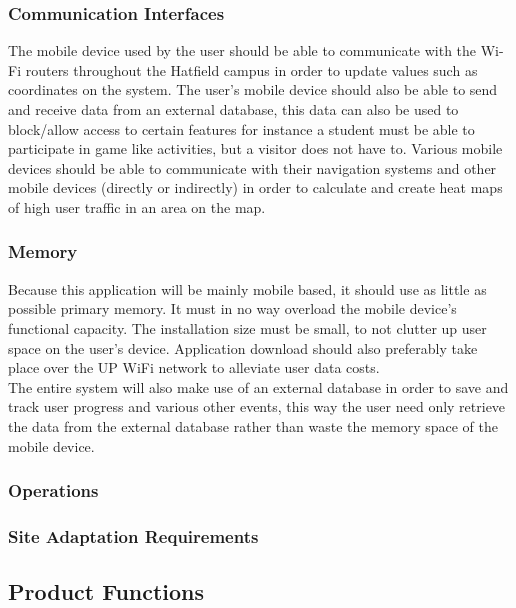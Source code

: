 \documentclass[a4paper,12pt]{article}
\begin{document}
\subsubsection{Communication Interfaces}
The mobile device used by the user should be able to communicate with the Wi-Fi routers throughout the Hatfield campus in order to update values such as coordinates on the system. The user’s mobile device should also be able to send and receive data from an external database, this data can also be used to block/allow access to certain features for instance a student must be able to participate in game like activities, but a visitor does not have to. Various mobile devices should be able to communicate with their navigation systems and other mobile devices (directly or indirectly) in order to calculate and create heat maps of high user traffic in an area on the map.
\subsubsection{Memory}
Because this application will be mainly mobile based, it should use as little as possible primary memory. It must in no way overload the mobile device's functional capacity. The installation size must be small, to not clutter up user space on the user's device. Application download should also preferably take place over the UP WiFi network to alleviate user data costs.\\
The entire system will also make use of an external database in order to save and track user progress and various other events, this way the user need only retrieve the data from the external database rather than waste the memory space of the mobile device.
\subsubsection{Operations}
\subsubsection{Site Adaptation Requirements}
\subsection{Product Functions}
\end{document}
